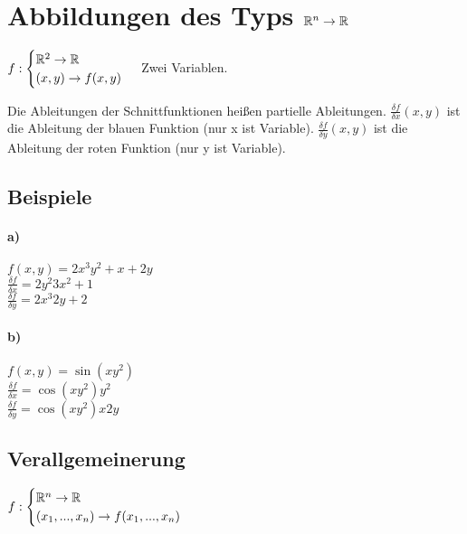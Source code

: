 \renewcommand{\ldate}{2015-10-01}	%

\section{Abbildungen des Typs $\mathbb{R}^n \rightarrow \mathbb{R}$}
$f: 
\begin{cases}
 \mathbb{R}^2 \rightarrow \mathbb{R}\\
 (x,y)\rightarrow f(x,y)
\end{cases}
$
Zwei Variablen.  


Die Ableitungen der Schnittfunktionen heißen partielle Ableitungen. $\frac{\delta f}{\delta x} (x,y)$ ist die Ableitung der blauen Funktion (nur x ist Variable). $\frac{\delta f}{\delta y} (x,y)$ ist die Ableitung der roten Funktion (nur y ist Variable).

\subsection{Beispiele}

\paragraph{a)} $f(x,y)= 2x^3y^2 + x+2y $\\
$\frac{\delta f}{\delta x} = 2y^2 3x^2 + 1 $\\
$\frac{\delta f}{\delta y} = 2x^3 2y + 2 $

\paragraph{b)} $f(x,y) = \sin(x y^2)$\\
$\frac{\delta f}{\delta x} = \cos(x y^2) y^2$\\
$\frac{\delta f}{\delta y} = \cos(x y^2) x 2y$

\subsection{Verallgemeinerung}
$f: 
\begin{cases}
 \mathbb{R}^n \rightarrow \mathbb{R}\\
 (x_1, ..., x_n) \rightarrow f(x_1, ..., x_n)\\
\end{cases}
$\\

